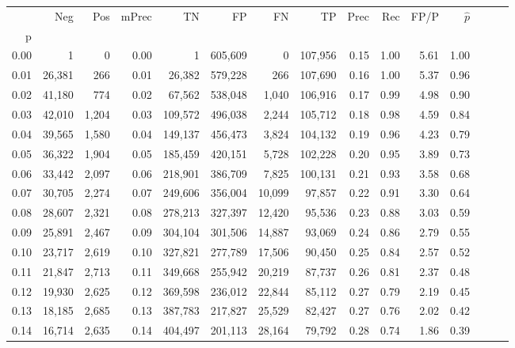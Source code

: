 \begin{tabular}{rrrrrrrrrrrrrrr}
\toprule
{} &     Neg &    Pos & mPrec &       TN &       FP &       FN &       TP &  Prec &   Rec &  FP/P & $\hat{p}$ \\
p    &         &        &       &          &          &          &          &       &       &       &           \\
\midrule
0.00 &       1 &      0 &  0.00 &        1 &  605,609 &        0 &  107,956 &  0.15 &  1.00 &  5.61 &      1.00 \\
0.01 &  26,381 &    266 &  0.01 &   26,382 &  579,228 &      266 &  107,690 &  0.16 &  1.00 &  5.37 &      0.96 \\
0.02 &  41,180 &    774 &  0.02 &   67,562 &  538,048 &    1,040 &  106,916 &  0.17 &  0.99 &  4.98 &      0.90 \\
0.03 &  42,010 &  1,204 &  0.03 &  109,572 &  496,038 &    2,244 &  105,712 &  0.18 &  0.98 &  4.59 &      0.84 \\
0.04 &  39,565 &  1,580 &  0.04 &  149,137 &  456,473 &    3,824 &  104,132 &  0.19 &  0.96 &  4.23 &      0.79 \\
0.05 &  36,322 &  1,904 &  0.05 &  185,459 &  420,151 &    5,728 &  102,228 &  0.20 &  0.95 &  3.89 &      0.73 \\
0.06 &  33,442 &  2,097 &  0.06 &  218,901 &  386,709 &    7,825 &  100,131 &  0.21 &  0.93 &  3.58 &      0.68 \\
0.07 &  30,705 &  2,274 &  0.07 &  249,606 &  356,004 &   10,099 &   97,857 &  0.22 &  0.91 &  3.30 &      0.64 \\
0.08 &  28,607 &  2,321 &  0.08 &  278,213 &  327,397 &   12,420 &   95,536 &  0.23 &  0.88 &  3.03 &      0.59 \\
0.09 &  25,891 &  2,467 &  0.09 &  304,104 &  301,506 &   14,887 &   93,069 &  0.24 &  0.86 &  2.79 &      0.55 \\
0.10 &  23,717 &  2,619 &  0.10 &  327,821 &  277,789 &   17,506 &   90,450 &  0.25 &  0.84 &  2.57 &      0.52 \\
0.11 &  21,847 &  2,713 &  0.11 &  349,668 &  255,942 &   20,219 &   87,737 &  0.26 &  0.81 &  2.37 &      0.48 \\
0.12 &  19,930 &  2,625 &  0.12 &  369,598 &  236,012 &   22,844 &   85,112 &  0.27 &  0.79 &  2.19 &      0.45 \\
0.13 &  18,185 &  2,685 &  0.13 &  387,783 &  217,827 &   25,529 &   82,427 &  0.27 &  0.76 &  2.02 &      0.42 \\
0.14 &  16,714 &  2,635 &  0.14 &  404,497 &  201,113 &   28,164 &   79,792 &  0.28 &  0.74 &  1.86 &      0.39 \\

\end{tabular}
